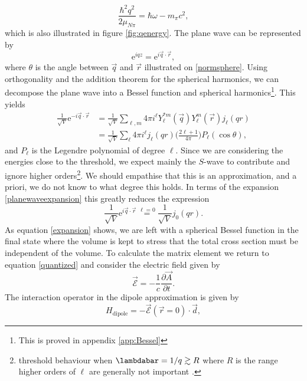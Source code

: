 \begin{equation}\label{key}
	\frac{\hbar^2 q^2}{2\mu_{N\pi}}=\hbar \omega-m_\pi c^2,
\end{equation}
which is also illustrated in figure \ref{fig:qenergy}. The plane wave can be represented by 
\begin{equation} \label{key}
	\text{e}^{iqz} = \text{e}^{i \vec{q}\cdot \vec{r}},
\end{equation}
where $\theta$ is the angle between $\vec{q}$ and $\vec{r}$ illustrated on \ref{normsphere}. Using orthogonality and the addition theorem for the spherical harmonics, we can decompose the plane wave into a Bessel function and spherical harmonics\footnote{This is proved in appendix \ref{app:Bessel}}. This yields
\begin{align}\label{planewaveexpansion}
	\frac{1}{\sqrt{V}} \text{e}^{-i\vec{q}\cdot\vec{r}} &= \frac{1}{\sqrt{V}} \sum_{\ell,m} 4\pi i^\ell Y_\ell^{*m}(\vec{q})Y_\ell^m(\vec{r})j_\ell(qr) \\
	&= \frac{1}{\sqrt{V}} \sum_\ell 4\pi i^\ell j_\ell(qr) \bigg( \frac{2\ell+1}{4\pi}\bigg)P_\ell(\cos\theta),
\end{align}
and $P_\ell$ is the Legendre polynomial of degree $\ell$. Since we are considering the energies close to the threshold, we expect mainly the $S$-wave to contribute and ignore higher orders\footnote{threshold behaviour when $\lambdabar=1/q\gtrsim R$ where $R$ is the range higher orders of $\ell$ are generally not important \cite{Sakurai}.}. We should empathise that this is an approximation, and a priori, we do not know to what degree this holds. In terms of the expansion \eqref{planewaveexpansion} this greatly reduces the expression
\begin{equation} \label{expansion}
	\frac{1}{\sqrt{V}}\text{e}^{i\vec{q}\cdot \vec{r}} \stackrel{\ell=0}{=} \frac{1}{\sqrt{V}}j_0(qr).
\end{equation}
As equation \eqref{expansion} shows, we are left with a spherical Bessel function in the final state where the volume is kept to stress that the total cross section must be independent of the volume. To calculate the matrix element we return to equation \eqref{quantized} and consider the electric field given by
\begin{equation}\label{EF}
	\vec{\mathcal{E}} = -\frac{1}{c} \frac{\partial \vec{A}}{\partial t}.
\end{equation}
The interaction operator in the dipole approximation is given by
\begin{equation}\label{Dip}
	H_\text{dipole} = -\vec{\mathcal{E}}(\vec{r}=0)\cdot \vec{d},
\end{equation}
